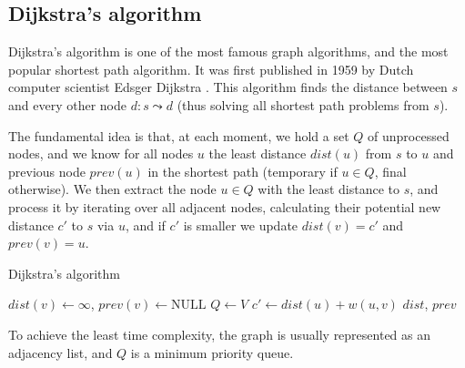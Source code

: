 \subsection{Dijkstra's algorithm} \label{algorithm-shortestpath-dijkstra}
Dijkstra's algorithm is one of the most famous graph algorithms, and the most popular shortest path algorithm. It was first published in 1959 by Dutch computer scientist Edsger Dijkstra \cite{dijkstra}. This algorithm finds the distance between $s$ and every other node $d \colon s \leadsto d$ (thus solving all shortest path problems from $s$).\par
The fundamental idea is that, at each moment, we hold a set $Q$ of unprocessed nodes, and we know for all nodes $u$ the least distance $dist(u)$ from $s$ to $u$ and previous node $prev(u)$ in the shortest path (temporary if $u \in Q$, final otherwise). We then extract the node $u \in Q$ with the least distance to $s$, and process it by iterating over all adjacent nodes, calculating their potential new distance $c'$ to $s$ via $u$, and if $c'$ is smaller we update $dist(v)=c'$ and $prev(v)=u$.\par
\begin{algorithm}[h]
    \caption{Dijkstra's algorithm}
    \label{alg-dijkstra}
    \begin{algorithmic}[1]
                {$dist(v) \gets \infty$, $prev(v) \gets \text{NULL}$} 
            \EndFor
            \State $Q \gets V$
             
                    \State $c' \gets dist(u) + w(u, v)$
                    \EndIf
                \EndFor
            \EndWhile
            \State \Return $dist$, $prev$
        \EndFunction
    \end{algorithmic}
\end{algorithm}
To achieve the least time complexity, the graph is usually represented as an adjacency list, and $Q$ is a minimum priority queue.
